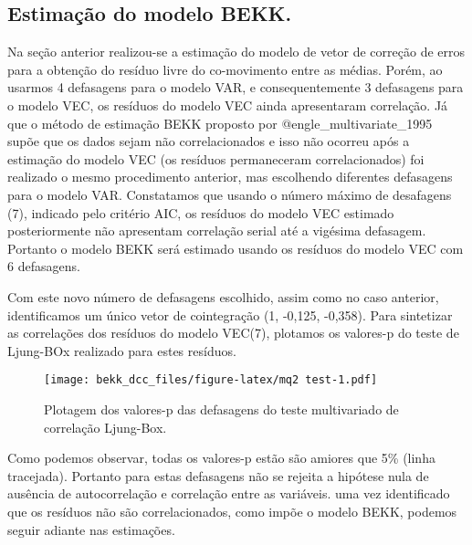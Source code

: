 \documentclass[]{article}
\title{}
\author{}
\date{}
\begin{document}
\subsection{Estimação do modelo BEKK.}\label{estimacao-do-modelo-bekk.}

Na seção anterior realizou-se a estimação do modelo de vetor de correção
de erros para a obtenção do resíduo livre do co-movimento entre as
médias. Porém, ao usarmos 4 defasagens para o modelo VAR, e
consequentemente 3 defasagens para o modelo VEC, os resíduos do modelo
VEC ainda apresentaram correlação. Já que o método de estimação BEKK
proposto por @engle\_multivariate\_1995 supõe que os dados sejam não
correlacionados e isso não ocorreu após a estimação do modelo VEC (os
resíduos permaneceram correlacionados) foi realizado o mesmo
procedimento anterior, mas escolhendo diferentes defasagens para o
modelo VAR. Constatamos que usando o número máximo de desafagens (7),
indicado pelo critério AIC, os resíduos do modelo VEC estimado
posteriormente não apresentam correlação serial até a vigésima
defasagem. Portanto o modelo BEKK será estimado usando os resíduos do
modelo VEC com 6 defasagens.

Com este novo número de defasagens escolhido, assim como no caso
anterior, identificamos um único vetor de cointegração (1, -0,125,
-0,358). Para sintetizar as correlações dos resíduos do modelo VEC(7),
plotamos os valores-p do teste de Ljung-BOx realizado para estes
resíduos.

\begin{figure}[htbp]
\centering
\texttt{[image: bekk\_dcc\_files/figure-latex/mq2 test-1.pdf]}
\caption{Plotagem dos valores-p das defasagens do teste multivariado de
correlação Ljung-Box.}
\end{figure}

Como podemos observar, todas os valores-p estão são amiores que 5\%
(linha tracejada). Portanto para estas defasagens não se rejeita a
hipótese nula de ausência de autocorrelação e correlação entre as
variáveis. uma vez identificado que os resíduos não são correlacionados,
como impõe o modelo BEKK, podemos seguir adiante nas estimações.
\end{document}
